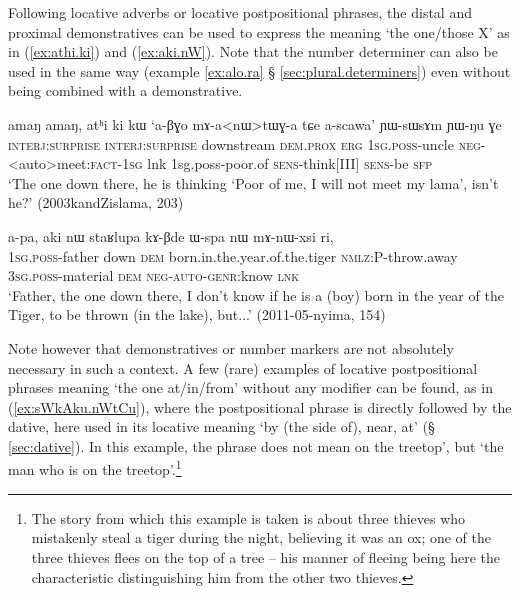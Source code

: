 Following locative adverbs or locative postpositional phrases, the distal and proximal demonstratives can be used to express the meaning `the one/those X' as in (\ref{ex:athi.ki}) and (\ref{ex:aki.nW}). Note that the number determiner  can also be used in the same way (example \ref{ex:alo.ra} § \ref{sec:plural.determiners}) even without being combined with a demonstrative.

\begin{exe}
\ex \label{ex:athi.ki}
\gll amaŋ amaŋ, atʰi ki kɯ `a-βɣo mɤ-a<nɯ>tɯɣ-a tɕe a-scawa' ɲɯ-sɯsɤm ɲɯ-ŋu ɣe \\
\textsc{interj}:\textsc{surprise} \textsc{interj}:\textsc{surprise}  downstream \textsc{dem}.\textsc{prox} \textsc{erg} \textsc{1sg}.\textsc{poss}-uncle \textsc{neg}-<auto>meet:\textsc{fact}-\textsc{1sg} lnk 1sg.poss-poor.of \textsc{sens}-think[III] \textsc{sens}-be \textsc{sfp} \\
\glt `The one down there, he is thinking `Poor of me, I will not meet my lama', isn't he?' (2003kandZislama, 203)
\end{exe}

\begin{exe}
\ex \label{ex:aki.nW}
\gll a-pa, aki nɯ staʁlupa kɤ-βde ɯ-spa nɯ mɤ-nɯ-xsi ri, \\
\textsc{1sg}.\textsc{poss}-father down \textsc{dem} born.in.the.year.of.the.tiger \textsc{nmlz}:P-throw.away \textsc{3sg}.\textsc{poss}-material \textsc{dem} \textsc{neg}-\textsc{auto}-\textsc{genr}:know \textsc{lnk} \\
\glt `Father, the one down there, I don't know if he is a (boy) born in the year of the Tiger, to be thrown (in the lake), but...' (2011-05-nyima, 154)
\end{exe}

Note however that demonstratives or number markers are not absolutely necessary in such a context. A few (rare) examples of locative postpositional phrases meaning `the one at/in/from' without any modifier can be found, as in (\ref{ex:sWkAku.nWtCu}), where the postpositional phrase is directly followed by the dative, here used in its locative meaning `by (the side of), near, at' (§ \ref{sec:dative}). In this example, the phrase  does not mean  on the treetop', but `the man who is on the treetop'.\footnote{The story from which this example is taken is about three thieves who mistakenly steal a tiger during the night, believing it was an ox; one of the three thieves flees on the top of a tree -- his manner of fleeing being here the characteristic distinguishing him from the other two thieves.}

